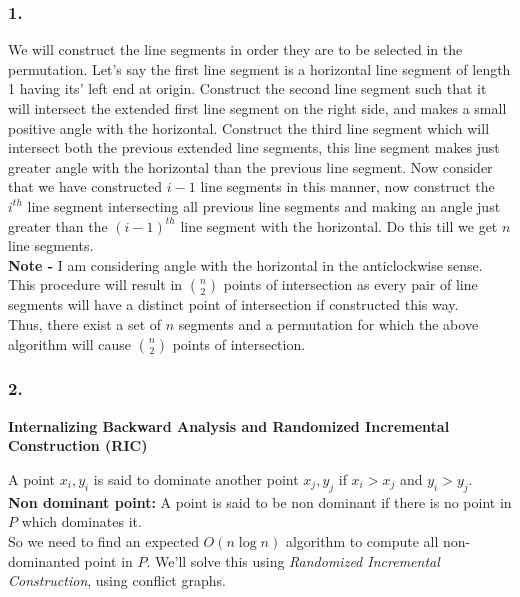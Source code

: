\documentclass[a4paper]{article}
\begin{document}
\subsubsection*{1.}
We will construct the line segments in order they are to be selected in the permutation. Let's say the first line segment is a horizontal line segment of length 1 having its' left end at origin. Construct the second line segment such that it will intersect the extended first line segment on the right side, and makes a small positive angle with the horizontal. 
Construct the third line segment which will intersect both the previous extended line segments, this line segment makes just greater angle with the horizontal than the previous line segment.
Now consider that we have constructed $i-1$ line segments in this manner, now construct the $i^{th}$ line segment intersecting all previous line segments and making an angle just greater than the ${(i-1)}^{th}$ line segment with the horizontal. Do this till we get $n$ line segments.\\
\textbf{Note - }I am considering angle with the horizontal in the anticlockwise sense.\\
This procedure will result in $n\choose2$ points of intersection as every pair of line segments will have a distinct point of intersection if constructed this way.\\
Thus, there exist a set of $n$ segments and a permutation for which the above algorithm will cause $n\choose2$ points of intersection.
\subsubsection*{2.}

\pagebreak

\begin{question}[]
\textbf{Internalizing Backward Analysis and Randomized Incremental Construction (RIC)}
\end{question}
A point $x_i, y_i$ is said to dominate another point $x_j, y_j$ if $x_i > x_j$ and $y_i > y_j$. \\
\textbf{Non dominant point: } A point is said to be non dominant if there is no point in $P$ which dominates it. \\
So we need to find an expected $O(n\log n)$ algorithm to compute all non-dominanted point in $P$. We'll solve this using \textit{Randomized Incremental Construction}, using conflict graphs. \\ \\
\end{document}
